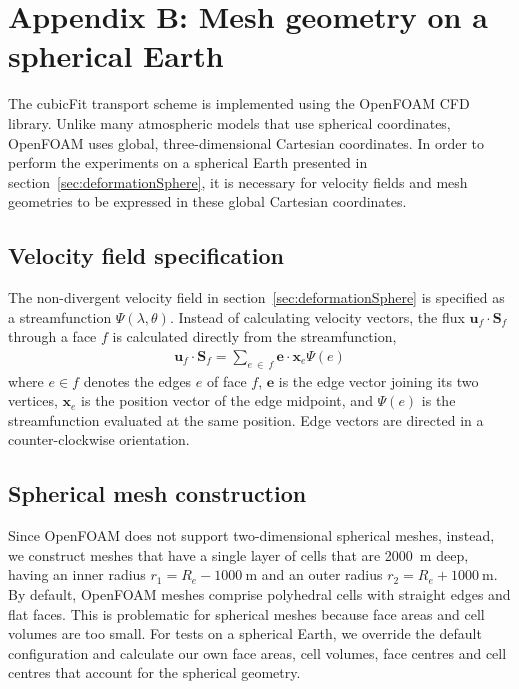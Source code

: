 \section*{Appendix B: Mesh geometry on a spherical Earth}

The cubicFit transport scheme is implemented using the OpenFOAM CFD library.  Unlike many atmospheric models that use spherical coordinates, OpenFOAM uses global, three-dimensional Cartesian coordinates.  In order to perform the experiments on a spherical Earth presented in section~\ref{sec:deformationSphere}, it is necessary for velocity fields and mesh geometries to be expressed in these global Cartesian coordinates.

\subsection*{Velocity field specification}
The non-divergent velocity field in section~\ref{sec:deformationSphere} is specified as a streamfunction $\Psi(\lambda, \theta)$.  Instead of calculating velocity vectors, the flux $\mathbf{u}_f \cdot \mathbf{S}_f$ through a face $f$ is calculated directly from the streamfunction,
\begin{align}
	\mathbf{u}_f \cdot \mathbf{S}_f	= \sum_{e\:\in\:f} \mathbf{e} \cdot \mathbf{x}_e \Psi(e) \label{eqn:nondiv-spherical-flux}
\end{align}
where $e \in f$ denotes the edges $e$ of face $f$, $\mathbf{e}$ is the edge vector joining its two vertices, $\mathbf{x}_e$ is the position vector of the edge midpoint, and $\Psi(e)$ is the streamfunction evaluated at the same position.
Edge vectors are directed in a counter-clockwise orientation.

\subsection*{Spherical mesh construction}

Since OpenFOAM does not support two-dimensional spherical meshes, instead, we construct meshes that have a single layer of cells that are \SI{2000}{\meter} deep, having an inner radius $r_1 = R_e - \SI{1000}{\meter}$ and an outer radius $r_2 = R_e + \SI{1000}{\meter}$.
By default, OpenFOAM meshes comprise polyhedral cells with straight edges and flat faces.  This is problematic for spherical meshes because face areas and cell volumes are too small.
For tests on a spherical Earth, we override the default configuration and calculate our own face areas, cell volumes, face centres and cell centres that account for the spherical geometry.  

